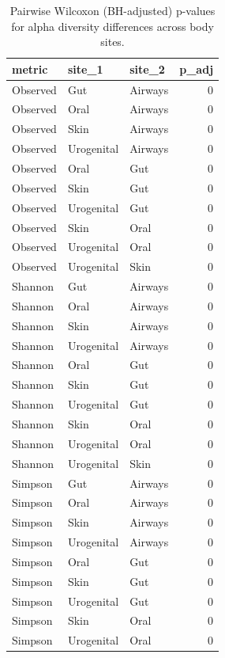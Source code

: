 \documentclass[
  letterpaper,
  DIV=11,
  numbers=noendperiod]{scrartcl}
\begin{document}
\begin{longtable}[]{@{}lllr@{}}

\caption{\label{tbl-alpha-pairwise}Pairwise Wilcoxon (BH-adjusted)
p-values for alpha diversity differences across body sites.}

\tabularnewline

\toprule\noalign{}
metric & site\_1 & site\_2 & p\_adj \\
\midrule\noalign{}
\endhead
\bottomrule\noalign{}
\endlastfoot
Observed & Gut & Airways & 0 \\
Observed & Oral & Airways & 0 \\
Observed & Skin & Airways & 0 \\
Observed & Urogenital & Airways & 0 \\
Observed & Oral & Gut & 0 \\
Observed & Skin & Gut & 0 \\
Observed & Urogenital & Gut & 0 \\
Observed & Skin & Oral & 0 \\
Observed & Urogenital & Oral & 0 \\
Observed & Urogenital & Skin & 0 \\
Shannon & Gut & Airways & 0 \\
Shannon & Oral & Airways & 0 \\
Shannon & Skin & Airways & 0 \\
Shannon & Urogenital & Airways & 0 \\
Shannon & Oral & Gut & 0 \\
Shannon & Skin & Gut & 0 \\
Shannon & Urogenital & Gut & 0 \\
Shannon & Skin & Oral & 0 \\
Shannon & Urogenital & Oral & 0 \\
Shannon & Urogenital & Skin & 0 \\
Simpson & Gut & Airways & 0 \\
Simpson & Oral & Airways & 0 \\
Simpson & Skin & Airways & 0 \\
Simpson & Urogenital & Airways & 0 \\
Simpson & Oral & Gut & 0 \\
Simpson & Skin & Gut & 0 \\
Simpson & Urogenital & Gut & 0 \\
Simpson & Skin & Oral & 0 \\
Simpson & Urogenital & Oral & 0 \\

\end{longtable}
\end{document}
